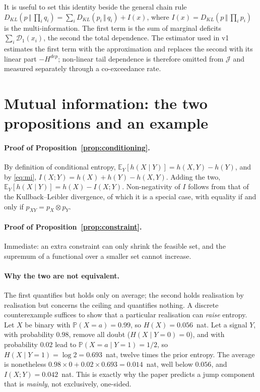 \documentclass[11pt]{article}
\theoremstyle{definition}
\theoremstyle{remark}
\newcommand{\JJ}{\mathcal{J}}
\newcommand{\Dun}{\mathcal{D}_1}
\newcommand{\KL}[2]{D_{KL}\!\left(#1\,\Vert\,#2\right)}
\begin{document}
It is useful to set this identity beside the general chain rule
$\KL{p}{\prod_i q_i}=\sum_i\KL{p_i}{q_i}+I(x)$, where
$I(x)=\KL{p}{\prod_i p_i}$ is the multi-information. The first term is the sum of
marginal deficits $\sum_i\Dun(x_i)$, the second the total dependence. The
estimator used in v1 estimates the first term with the \citet{hyvarinen1998}
approximation and replaces the second with its linear part $-H^{dep}$;
non-linear tail dependence is therefore omitted from $\JJ$ and measured
separately through a co-exceedance rate.

\section{Mutual information: the two propositions and an example}
\label{app:mi}

\paragraph{Proof of Proposition~\ref{prop:conditioning}.} By definition of
conditional entropy, $\mathbb{E}_Y[h(X\mid Y)]=h(X,Y)-h(Y)$, and by
\eqref{eq:mi}, $I(X;Y)=h(X)+h(Y)-h(X,Y)$. Adding the two,
$\mathbb{E}_Y[h(X\mid Y)]=h(X)-I(X;Y)$. Non-negativity of $I$ follows from that of
the Kullback--Leibler divergence, of which it is a special case, with equality if
and only if $p_{XY}=p_X\otimes p_Y$.

\paragraph{Proof of Proposition~\ref{prop:constraint}.} Immediate: an extra
constraint can only shrink the feasible set, and the supremum of a functional
over a smaller set cannot increase.

\paragraph{Why the two are not equivalent.} The first quantifies but holds only
on average; the second holds realisation by realisation but concerns the ceiling
and quantifies nothing. A discrete counterexample suffices to show that a
particular realisation can \emph{raise} entropy. Let $X$ be binary with
$\mathbb{P}(X=a)=0.99$, so $H(X)=0.056$~nat. Let a signal $Y$, with probability
$0.98$, remove all doubt ($H(X\mid Y=0)=0$), and with probability $0.02$ lead to
$\mathbb{P}(X=a\mid Y=1)=1/2$, so $H(X\mid Y=1)=\log 2=0.693$~nat, twelve times the
prior entropy. The average is nonetheless
$0.98\times0+0.02\times0.693=0.014$~nat, well below $0.056$, and
$I(X;Y)=0.042$~nat. This is exactly why the paper predicts a jump component that
is \emph{mainly}, not exclusively, one-sided.
\end{document}
